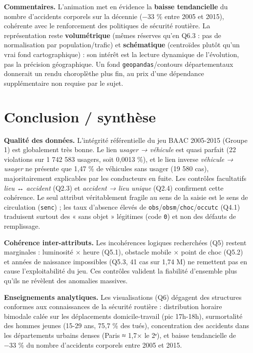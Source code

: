 \documentclass[11pt,a4paper]{article}
\newcommand{\rub}[2]{\textbf{\textcolor{#1}{#2}}}
\begin{document}
\rub{labcomment}{Commentaires.} L'animation met en évidence la \textbf{baisse tendancielle} du nombre d'accidents corporels sur la décennie (−33 \% entre 2005 et 2015), cohérente avec le renforcement des politiques de sécurité routière. La représentation reste \textbf{volumétrique} (mêmes réserves qu'en Q6.3 : pas de normalisation par population/trafic) et \textbf{schématique} (centroïdes plutôt qu'un vrai fond cartographique) : son intérêt est la lecture dynamique de l'évolution, pas la précision géographique. Un fond \texttt{geopandas}/contours départementaux donnerait un rendu choroplèthe plus fin, au prix d'une dépendance supplémentaire non requise par le sujet.

\section*{Conclusion / synthèse}

\textbf{Qualité des données.} L'intégrité référentielle du jeu BAAC 2005-2015 (Groupe 1) est globalement très bonne. Le lien \emph{usager → véhicule} est quasi parfait (22 violations sur 1 742 583 usagers, soit 0,0013 \%), et le lien inverse \emph{véhicule → usager} ne présente que 1,47 \% de véhicules sans usager (19 580 cas), majoritairement explicables par les conducteurs en fuite. Les contrôles facultatifs \emph{lieu ↔ accident} (Q2.3) et \emph{accident → lieu unique} (Q2.4) confirment cette cohérence. Le seul attribut véritablement fragile au sens de la saisie est le sens de circulation (\texttt{senc}) ; les taux d'absence élevés de \texttt{obs}/\texttt{obsm}/\texttt{choc}/\texttt{occutc} (Q4.1) traduisent surtout des « sans objet » légitimes (code \texttt{0}) et non des défauts de remplissage.

\textbf{Cohérence inter-attributs.} Les incohérences logiques recherchées (Q5) restent marginales : luminosité × heure (Q5.1), obstacle mobile × point de choc (Q5.2) et années de naissance impossibles (Q5.3, 41 cas sur 1,74 M) ne remettent pas en cause l'exploitabilité du jeu. Ces contrôles valident la fiabilité d'ensemble plus qu'ils ne révèlent des anomalies massives.

\textbf{Enseignements analytiques.} Les visualisations (Q6) dégagent des structures conformes aux connaissances de la sécurité routière : distribution horaire bimodale calée sur les déplacements domicile-travail (pic 17h-18h), surmortalité des hommes jeunes (15-29 ans, 75,7 \% des tués), concentration des accidents dans les départements urbains denses (Paris ≈ 1,7× le 2ᵉ), et baisse tendancielle de −33 \% du nombre d'accidents corporels entre 2005 et 2015.
\end{document}
